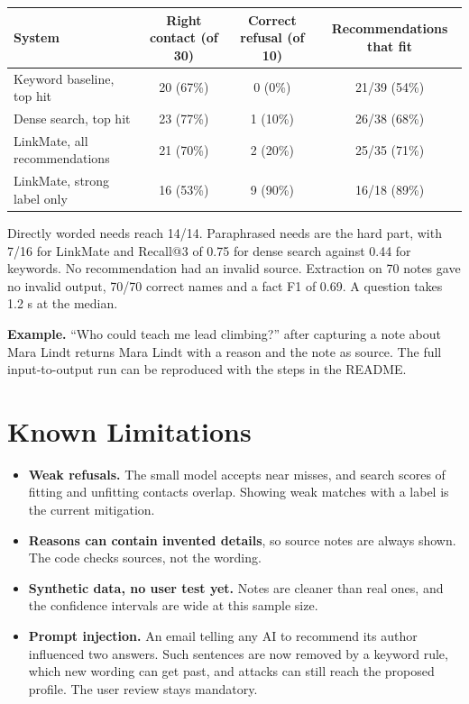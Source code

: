 \documentclass[10pt,letterpaper]{article}
\begin{document}
\begin{center}
\small
\begin{tabular}{@{}lccc@{}}
  \toprule
  System & Right contact (of 30) & Correct refusal (of 10) & Recommendations that fit \\
  \midrule
  Keyword baseline, top hit & 20 (67\%) & 0 (0\%) & 21/39 (54\%) \\
  Dense search, top hit & 23 (77\%) & 1 (10\%) & 26/38 (68\%) \\
  LinkMate, all recommendations & 21 (70\%) & 2 (20\%) & 25/35 (71\%) \\
  LinkMate, strong label only & 16 (53\%) & 9 (90\%) & 16/18 (89\%) \\
  \bottomrule
\end{tabular}
\end{center}

Directly worded needs reach 14/14. Paraphrased needs are the hard part, with 7/16 for LinkMate and Recall@3 of 0.75 for dense search against 0.44 for keywords. No recommendation had an invalid source. Extraction on 70 notes gave no invalid output, 70/70 correct names and a fact F1 of 0.69. A question takes 1.2 s at the median.

\textbf{Example.} ``Who could teach me lead climbing?'' after capturing a note about Mara Lindt returns Mara Lindt with a reason and the note as source. The full input-to-output run can be reproduced with the steps in the README.

\section{Known Limitations}
\begin{itemize}
  \item \textbf{Weak refusals.} The small model accepts near misses, and search scores of fitting and unfitting contacts overlap. Showing weak matches with a label is the current mitigation.
  \item \textbf{Reasons can contain invented details}, so source notes are always shown. The code checks sources, not the wording.
  \item \textbf{Synthetic data, no user test yet.} Notes are cleaner than real ones, and the confidence intervals are wide at this sample size.
  \item \textbf{Prompt injection.} An email telling any AI to recommend its author influenced two answers. Such sentences are now removed by a keyword rule, which new wording can get past, and attacks can still reach the proposed profile. The user review stays mandatory.
\end{itemize}
\end{document}
